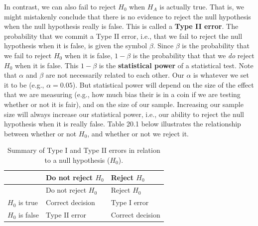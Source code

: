 \documentclass[
]{scrbook}
\begin{document}
In contrast, we can also fail to reject \(H_{0}\) when \(H_{A}\) is actually true.
That is, we might mistakenly conclude that there is no evidence to reject the null hypothesis when the null hypothesis really is false.
This is called a \textbf{Type II error}.
The probability that we commit a Type II error, i.e., that we fail to reject the null hypothesis when it is false, is given the symbol \(\beta\).
Since \(\beta\) is the probability that we fail to reject \(H_{0}\) when it is false, \(1 - \beta\) is the probability that that we \emph{do} reject \(H_{0}\) when it is false.
This \(1 - \beta\) is the \textbf{statistical power} of a statistical test.
Note that \(\alpha\) and \(\beta\) are not necessarily related to each other.
Our \(\alpha\) is whatever we set it to be (e.g., \(\alpha = 0.05\)).
But statistical power will depend on the size of the effect that we are measuring (e.g., how much bias their is in a coin if we are testing whether or not it is fair), and on the size of our sample.
Increasing our sample size will always increase our statistical power, i.e., our ability to reject the null hypothesis when it is really false.
Table 20.1 below illustrates the relationship between whether or not \(H_{0}\), and whether or not we reject it.

\begin{longtable}[]{@{}lll@{}}
\caption{Summary of Type I and Type II errors in relation to a null hypothesis (\(H_{0}\)).}\tabularnewline
\toprule
& Do not reject \(H_{0}\) & Reject \(H_{0}\) \\
\midrule
\endfirsthead
\toprule
& Do not reject \(H_{0}\) & Reject \(H_{0}\) \\
\midrule
\endhead
\(H_{0}\) is true & Correct decision & Type I error \\
\(H_{0}\) is false & Type II error & Correct decision \\
\bottomrule
\end{longtable}
\end{document}
